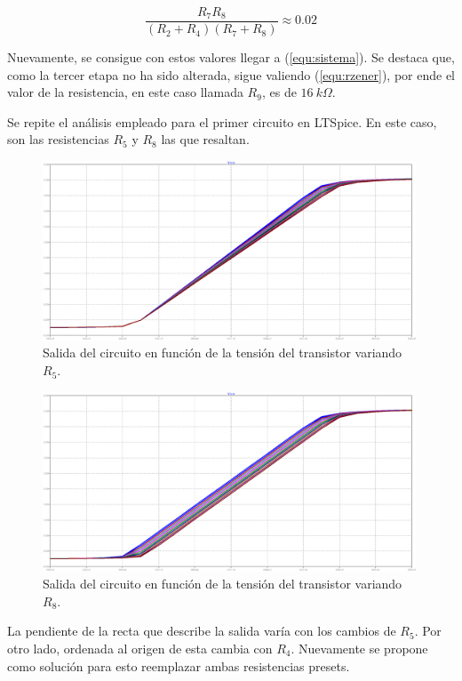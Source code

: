 \[
	\frac{R_7 R_8}{\left(R_2 + R_4 \right)\left(R_7 + R_8 \right)} \approx 0.02
\]

Nuevamente, se consigue con estos valores llegar a (\ref{equ:sistema}). Se destaca que, como la tercer etapa no ha sido alterada, sigue valiendo (\ref{equ:rzener}), por ende el valor de la resistencia, en este caso llamada $R_9$, es de $16 \ k\Omega$.

Se repite el análisis empleado para el primer circuito en LTSpice. En este caso, son las resistencias $R_5$ y $R_8$ las que resaltan.

\begin{figure}[H]
	\centering
	\includegraphics[width=0.99\textwidth]{Ejercicio6/Imagenes/StepR5-M2.png}
	\caption{Salida del circuito en función de la tensión del transistor variando $R_5$.}
	\label{fig:r5-M2}
\end{figure}

\begin{figure}[H]
	\centering
	\includegraphics[width=0.99\textwidth]{Ejercicio6/Imagenes/StepR8-M2.png}
	\caption{Salida del circuito en función de la tensión del transistor variando $R_8$.}
	\label{fig:r8-M2}
\end{figure}

La pendiente de la recta que describe la salida varía con los cambios de $R_5$. Por otro lado, ordenada al origen de esta cambia con $R_4$. Nuevamente se propone como solución para esto reemplazar ambas resistencias presets.

